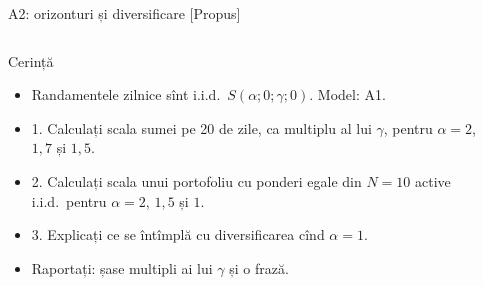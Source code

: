 \begin{frame}{A2: orizonturi și diversificare [Propus]}
\propsub
\itemsize{\footnotesize}
\begin{columns}[T]
\begin{column}{\taskw}
\begin{block}{Cerință}
\begin{itemize}
    \item Randamentele zilnice sînt i.i.d.\ $S(\alpha; 0; \gamma; 0)$. Model: A1.
    \item 1. Calculați scala sumei pe 20 de zile, ca multiplu al lui $\gamma$, pentru $\alpha = 2$, $1{,}7$ și $1{,}5$.
    \item 2. Calculați scala unui portofoliu cu ponderi egale din $N = 10$ active i.i.d.\ pentru $\alpha = 2$, $1{,}5$ și $1$.
    \item 3. Explicați ce se întîmplă cu diversificarea cînd $\alpha = 1$.
    \item Raportați: șase multipli ai lui $\gamma$ și o frază.
\end{itemize}
\end{block}
\end{column}
\begin{column}{\solw}
\end{column}
\end{columns}
\end{frame}

